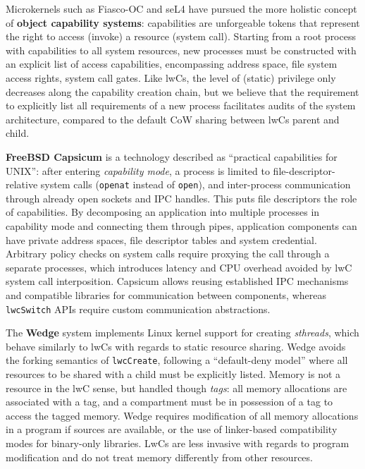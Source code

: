 \documentclass[10pt,twocolumn,a4paper]{article}
\begin{document}
Microkernels such as Fiasco-OC and seL4 have pursued the more holistic concept of \textbf{object capability systems}:
capabilities are unforgeable tokens that represent the right to access (invoke) a resource (system call).
Starting from a root process with capabilities to all system resources, new processes must be constructed with an explicit list of access capabilities, encompassing address space, file system access rights, system call gates.
Like lwCs, the level of (static) privilege only decreases along the capability creation chain, but we believe that the requirement to explicitly list all requirements of a new process facilitates audits of the system architecture, compared to the default CoW sharing between lwCs parent and child.
\cite{elphinstone2013l3}

\textbf{FreeBSD Capsicum} is a technology described as \enquote{practical capabilities for UNIX}:
after entering \textit{capability mode}, a process is limited to file-descriptor-relative system calls (\lstinline{openat} instead of \lstinline{open}), and inter-process communication through already open sockets and IPC handles.
This puts file descriptors the role of capabilities.
By decomposing an application into multiple processes in capability mode and connecting them through pipes, application components can have private address spaces, file descriptor tables and system credential.
Arbitrary policy checks on system calls require proxying the call through a separate processes, which introduces latency and CPU overhead avoided by lwC system call interposition.
Capsicum allows reusing established IPC mechanisms and compatible libraries for communication between components, whereas \lstinline{lwcSwitch} APIs require custom communication abstractions.
\cite{watson2010capsicum}


The \textbf{Wedge} system implements Linux kernel support for creating \textit{sthreads}, which behave similarly to lwCs with regards to static resource sharing.
Wedge avoids the forking semantics of \lstinline{lwcCreate}, following a \enquote{default-deny model} where all resources to be shared with a child must be explicitly listed.
Memory is not a resource in the lwC sense, but handled though \textit{tags}: all memory allocations are associated with a tag, and a compartment must be in possession of a tag to access the tagged memory.
Wedge requires modification of all memory allocations in a program if sources are available, or the use of linker-based compatibility modes for binary-only libraries.
LwCs are less invasive with regards to program modification and do not treat memory differently from other resources.
\cite{bittau2008wedge}
\end{document}
